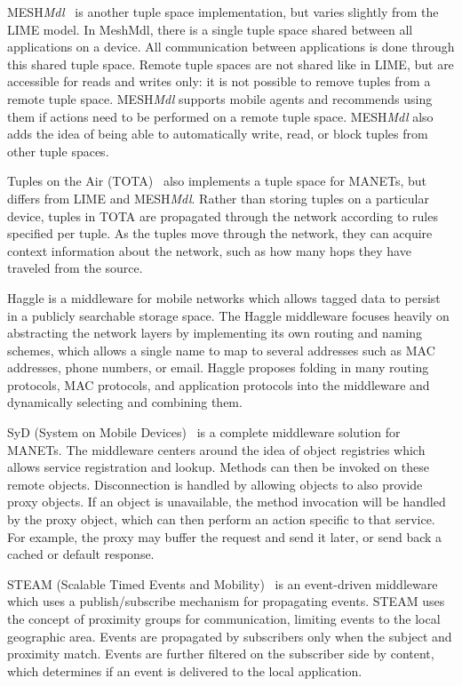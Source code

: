 MESH\textit{Mdl}~\cite{meshmdl} is another tuple space implementation, but varies slightly from the LIME model. In MeshMdl, there is a single tuple space shared between all applications on a device. All communication between applications is done through this shared tuple space. Remote tuple spaces are not shared like in LIME, but are accessible for reads and writes only: it is not possible to remove tuples from a remote tuple space. MESH\textit{Mdl} supports mobile agents and recommends using them if actions need to be performed on a remote tuple space. MESH\textit{Mdl} also adds the idea of being able to automatically write, read, or block tuples from other tuple spaces.

Tuples on the Air (TOTA)~\cite{tota} also implements a tuple space for MANETs, but differs from LIME and MESH\textit{Mdl}. Rather than storing tuples on a particular device, tuples in TOTA are propagated through the network according to rules specified per tuple. As the tuples move through the network, they can acquire context information about the network, such as how many hops they have traveled from the source.

Haggle \cite{haggle} is a middleware for mobile networks which allows tagged data to persist in a publicly searchable storage space. The Haggle middleware focuses heavily on abstracting the network layers by implementing its own routing and naming schemes, which allows a single name to map to several addresses such as MAC addresses, phone numbers, or email. Haggle proposes folding in many routing protocols, MAC protocols, and application protocols into the middleware and dynamically selecting and combining them.

SyD (System on Mobile Devices)~\cite{syd} is a complete middleware solution for MANETs. The middleware centers around the idea of object registries which allows service registration and lookup. Methods can then be invoked on these remote objects. Disconnection is handled by allowing objects to also provide proxy objects. If an object is unavailable, the method invocation will be handled by the proxy object, which can then perform an action specific to that service. For example, the proxy may buffer the request and send it later, or send back a cached or default response.

STEAM (Scalable Timed Events and Mobility)~\cite{steam} is an event-driven middleware which uses a publish/subscribe\cite{psfaces} mechanism for propagating events. STEAM uses the concept of proximity groups for communication, limiting events to the local geographic area. Events are propagated by subscribers only when the subject and proximity match. Events are further filtered on the subscriber side by content, which determines if an event is delivered to the local application.

